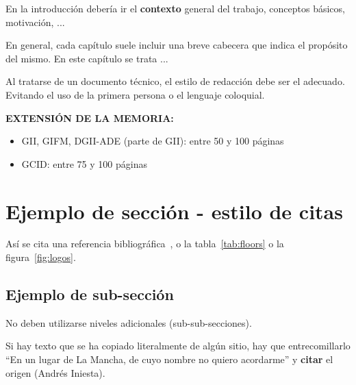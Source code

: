 

En la introducción debería ir el \textbf{contexto} general del trabajo, conceptos básicos, motivación, ...

En general, cada capítulo suele incluir una breve cabecera que indica el propósito del mismo. En este capítulo se trata ...

Al tratarse de un documento técnico, el estilo de redacción debe ser el adecuado. Evitando el uso de la primera persona o el lenguaje coloquial.

\vspace{1cm}

\textbf{EXTENSIÓN DE LA MEMORIA:}

\begin{itemize}
    \item GII, GIFM, DGII-ADE (parte de GII): entre 50 y 100 páginas
    \item GCID: entre 75 y 100 páginas
\end{itemize}

\section{Ejemplo de sección - estilo de citas}

Así se cita una referencia bibliográfica~\cite{Castrillon11-mva}, o la tabla~\ref{tab:floors} o la figura~\ref{fig:logos}.

\subsection{Ejemplo de sub-sección}

No deben utilizarse niveles adicionales (sub-sub-secciones).

Si hay texto que se ha copiado literalmente de algún sitio, hay que entrecomillarlo ``En un lugar de La Mancha, de cuyo nombre no quiero acordarme'' y \textbf{citar} el origen (Andrés Iniesta).

